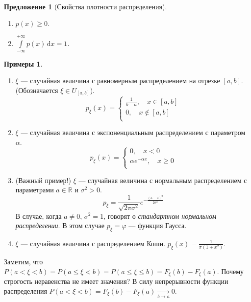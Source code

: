 \documentclass[11pt,openany,a4paper]{scrartcl}
\theoremstyle{plain}
\newtheorem{proposition}[theorem]{Предложение}
\theoremstyle{definition}
\newtheorem{examples}[theorem]{Примеры}
\newcommand\mb{\mathbb}
\newcommand\real{\mb R}
\newcommand{\underto}[1]{\xrightarrow[#1]{}}
\newcommand{\dif}{\, \mathrm d}
\begin{document}
\begin{proposition}[Свойства плотности распределения]
    \begin{enumerate}
        \item $p(x) \geqslant 0$.
        \item $\int\limits_{-\infty}^{+\infty} p(x) \dif x = 1$.
    \end{enumerate}
\end{proposition}
\begin{examples}
    \begin{enumerate}
        \item $\xi$ — случайная величина с равномерным распределением на
        отрезке $[a,b]$. (Обозначается $\xi \in U_{[a,b]}$).
        $$
        p_\xi (x) =
        \begin{cases}
            \frac{1}{b-a},\quad x \in [a,b] \\
            0, \quad x \notin [a,b] \\
        \end{cases}
        $$
        \item $\xi$ — случайная величина с экспоненциальным распределением с 
        параметром $\alpha$.
        $$
        p_\xi(x) =
        \begin{cases}
            0,\quad x < 0 \\
            \alpha e^{-\alpha x},\quad x \geqslant 0 \\
        \end{cases}
        $$
        \item (Важный пример!) $\xi$ — случайная величина с нормальным 
        распределением с параметрами $a \in \real$ и $\sigma^2 > 0$.
        $$
        p_\xi = \frac{1}{\sqrt{2\pi \sigma^2}}e^{- \frac{(x - a)^2}{2\sigma^2}}
        $$
        В случае, когда $a \neq 0$, $\sigma^2 = 1$, говорят о \emph{стандартном 
        нормальном распределении}.
        В этом случае $p_\xi = \varphi$ — функция Гаусса.
        \item $\xi$ — случайная величина с распределением Коши.
        $p_\xi(x) = \frac{1}{\pi (1 + x^2)}$.
    \end{enumerate}
\end{examples}

Заметим, что $P(a < \xi < b) = P(a \leqslant \xi < b) =
P(a \leqslant \xi \leqslant b) = F_\xi(b) - F_\xi(a)$. Почему строгость неравенства
не имеет значения? В силу непрерывности функции распределения
$P(a < \xi < b) = F_\xi(b) - F_\xi(a) \underto{b \to a} 0$.
\end{document}
